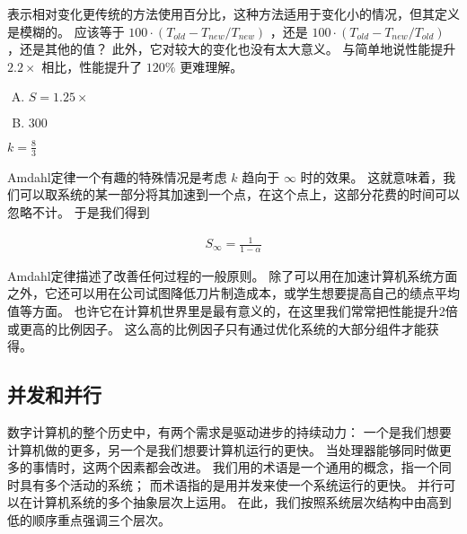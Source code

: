 {{\begin{sidenote}[表示相对性能]
            表示相对变化更传统的方法使用百分比，这种方法适用于变化小的情况，但其定义是模糊的。
            应该等于 $100 \cdot (T_{old} - T_{new} / T_{new})$ ，还是 $100 \cdot (T_{old} - T_{new} / T_{old})$ ，还是其他的值？
            此外，它对较大的变化也没有太大意义。
            与简单地说性能提升 $2.2 \times$ 相比，性能提升了 $120 \%$ 更难理解。
        \end{sidenote}

        \begin{example}
            \begin{enumerate}[A.]
                \item $S = 1.25 \times$
                \item $300$
            \end{enumerate}
        \end{example}

        \begin{example}
            $k = \frac{8}{3}$
        \end{example}

        Amdahl定律一个有趣的特殊情况是考虑 $k$ 趋向于 $\infty$ 时的效果。
        这就意味着，我们可以取系统的某一部分将其加速到一个点，在这个点上，这部分花费的时间可以忽略不计。
        于是我们得到

        \begin{align*}
            S_{\infty} = \frac{1}{1 - \alpha}
        \end{align*}

        Amdahl定律描述了改善任何过程的一般原则。
        除了可以用在加速计算机系统方面之外，它还可以用在公司试图降低刀片制造成本，或学生想要提高自己的绩点平均值等方面。
        也许它在计算机世界里是最有意义的，在这里我们常常把性能提升2倍或更高的比例因子。
        这么高的比例因子只有通过优化系统的大部分组件才能获得。
    }

    \subsection{并发和并行}
    {
        数字计算机的整个历史中，有两个需求是驱动进步的持续动力：
        一个是我们想要计算机做的更多，另一个是我们想要计算机运行的更快。
        当处理器能够同时做更多的事情时，这两个因素都会改进。
        我们用的术语是一个通用的概念，指一个同时具有多个活动的系统；
        而术语指的是用并发来使一个系统运行的更快。
        并行可以在计算机系统的多个抽象层次上运用。
        在此，我们按照系统层次结构中由高到低的顺序重点强调三个层次。

}}
